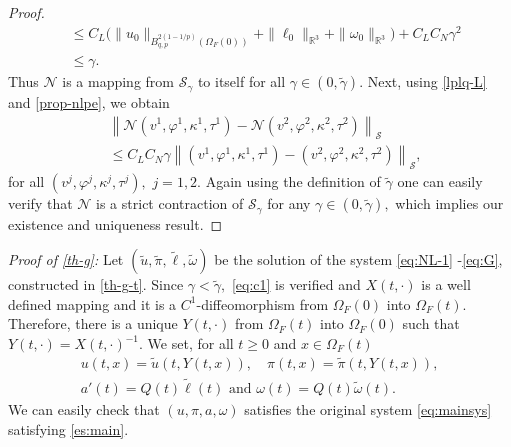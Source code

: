 \documentclass[12pt,a4paper,reqno]{amsart}
\theoremstyle{definition}
\theoremstyle{remark}
\numberwithin{equation}{section}
\newcommand{\oft}{\Omega_{F}(t)}
\newcommand{\ofo}{\Omega_{F}(0)}
\newcommand{\rt}{\mathbb{R}^{3}}
\begin{document}
\begin{proof}
\begin{align*}
& \leqslant C_{L} \Big(\|u_{0}\|_{B^{2(1-1/p)}_{q,p}(\ofo)} + \|\ell_{0}\|_{\rt} + \|\omega_{0}\|_{\rt} \Big) + C_{L} C_{N} \gamma^{2} \\
& \leqslant  \gamma.
\end{align*}
Thus $\mathcal{N}$ is a mapping from $\mathcal{S}_{\gamma}$ to itself for all $\gamma \in (0,\widetilde \gamma).$ Next, using \cref{lplq-L} and \cref{prop-nlpe}, we obtain
\begin{align*}
&\left\|\mathcal{N}(v^{1}, \varphi^{1}, \kappa^{1}, \tau^{1})  -  \mathcal{N}(v^{2}, \varphi^{2}, \kappa^{2}, \tau^{2}) \right\|_{\mathcal{S}} \\
& \leqslant C_{L} C_{N} \gamma \left\|(v^{1}, \varphi^{1}, \kappa^{1}, \tau^{1})  -  (v^{2}, \varphi^{2}, \kappa^{2}, \tau^{2}) \right\|_{\mathcal{S}},
\end{align*}
for all $(v^{j}, \varphi^{j}, \kappa^{j}, \tau^{j}),$ $j=1,2.$  Again using the definition of $\widetilde \gamma$ one can easily verify that $\mathcal{N}$ is a strict contraction of $\mathcal{S}_{\gamma}$ for any $\gamma \in (0, \widetilde \gamma),$ which implies our existence and uniqueness result.
\end{proof}


\textit{Proof of \cref{th-g}:}
Let $(\widetilde u, \widetilde \pi,\widetilde\ell, \widetilde\omega)$ be the solution of the system \eqref{eq:NL-1} -\eqref{eq:G}, constructed in \cref{th-g-t}. Since $\gamma < \widetilde \gamma,$ \eqref{eq:c1} is verified and $X(t,\cdot)$ is a well defined mapping and it is a $C^{1}$-diffeomorphism from $\Omega_{F}(0)$ into $\oft.$ Therefore, there is a unique $Y(t,\cdot)$ from $\Omega_{F}(t)$  into $\ofo$ such that $Y(t,\cdot)= X(t,\cdot)^{-1}.$ We set, for all $t \geqslant 0$ and $x \in \oft$
\begin{gather*}
u(t,x) = \widetilde u (t, Y(t,x)), \quad \pi(t,x) = \widetilde \pi(t, Y(t,x)), \\
 a'(t) = Q(t) \widetilde \ell(t) \mbox{ and } \omega(t)  = Q(t) \widetilde \omega(t).
\end{gather*}
We can easily check that $(u, \pi, a, \omega)$ satisfies the original system \eqref{eq:mainsys} satisfying \eqref{es:main}.




\end{document}
